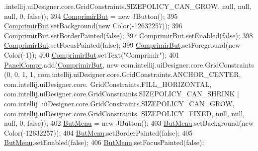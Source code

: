 \begin{DoxyCode}
      .intellij.uiDesigner.core.GridConstraints.SIZEPOLICY\_CAN\_GROW, null, null, null, 0, \textcolor{keyword}{false}));
394         \hyperlink{classpresentacion_1_1form_1_1mainForm_a8a68ad38dda26d35d37dccec4fa9338d}{ComprimirBut} = \textcolor{keyword}{new} JButton();
395         \hyperlink{classpresentacion_1_1form_1_1mainForm_a8a68ad38dda26d35d37dccec4fa9338d}{ComprimirBut}.setBackground(\textcolor{keyword}{new} Color(-12632257));
396         \hyperlink{classpresentacion_1_1form_1_1mainForm_a8a68ad38dda26d35d37dccec4fa9338d}{ComprimirBut}.setBorderPainted(\textcolor{keyword}{false});
397         \hyperlink{classpresentacion_1_1form_1_1mainForm_a8a68ad38dda26d35d37dccec4fa9338d}{ComprimirBut}.setEnabled(\textcolor{keyword}{false});
398         \hyperlink{classpresentacion_1_1form_1_1mainForm_a8a68ad38dda26d35d37dccec4fa9338d}{ComprimirBut}.setFocusPainted(\textcolor{keyword}{false});
399         \hyperlink{classpresentacion_1_1form_1_1mainForm_a8a68ad38dda26d35d37dccec4fa9338d}{ComprimirBut}.setForeground(\textcolor{keyword}{new} Color(-1));
400         \hyperlink{classpresentacion_1_1form_1_1mainForm_a8a68ad38dda26d35d37dccec4fa9338d}{ComprimirBut}.setText(\textcolor{stringliteral}{"Comprimir"});
401         \hyperlink{classpresentacion_1_1form_1_1mainForm_a2d0f3d20d2a80c16321aaccbc273279d}{PanelCompr}.add(\hyperlink{classpresentacion_1_1form_1_1mainForm_a8a68ad38dda26d35d37dccec4fa9338d}{ComprimirBut}, \textcolor{keyword}{new} com.intellij.uiDesigner.core.GridConstraints
      (0, 0, 1, 1, com.intellij.uiDesigner.core.GridConstraints.ANCHOR\_CENTER, com.intellij.uiDesigner.core.
      GridConstraints.FILL\_HORIZONTAL, com.intellij.uiDesigner.core.GridConstraints.SIZEPOLICY\_CAN\_SHRINK | com.intellij
      .uiDesigner.core.GridConstraints.SIZEPOLICY\_CAN\_GROW, com.intellij.uiDesigner.core.GridConstraints.
      SIZEPOLICY\_FIXED, null, null, null, 0, \textcolor{keyword}{false}));
402         \hyperlink{classpresentacion_1_1form_1_1mainForm_aef69e0291d6680e935cf1161971b3b29}{ButMenu} = \textcolor{keyword}{new} JButton();
403         \hyperlink{classpresentacion_1_1form_1_1mainForm_aef69e0291d6680e935cf1161971b3b29}{ButMenu}.setBackground(\textcolor{keyword}{new} Color(-12632257));
404         \hyperlink{classpresentacion_1_1form_1_1mainForm_aef69e0291d6680e935cf1161971b3b29}{ButMenu}.setBorderPainted(\textcolor{keyword}{false});
405         \hyperlink{classpresentacion_1_1form_1_1mainForm_aef69e0291d6680e935cf1161971b3b29}{ButMenu}.setEnabled(\textcolor{keyword}{false});
406         \hyperlink{classpresentacion_1_1form_1_1mainForm_aef69e0291d6680e935cf1161971b3b29}{ButMenu}.setFocusPainted(\textcolor{keyword}{false});

\end{DoxyCode}
